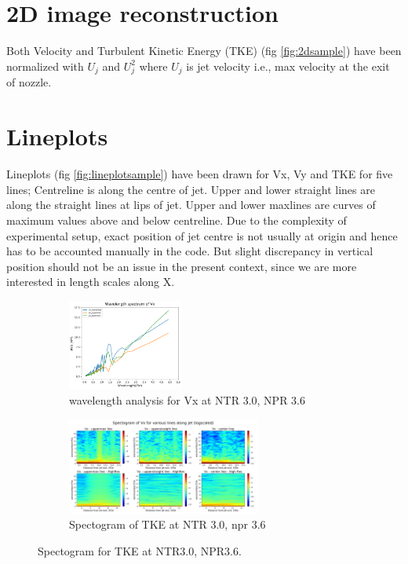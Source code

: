 \section{2D image reconstruction}
Both Velocity and Turbulent Kinetic Energy (TKE) (fig \ref{fig:2dsample}) have been normalized with $U_j$ and $U_j^2$ where $U_j$ is jet velocity i.e., max velocity at the exit of nozzle. 

\section{Lineplots}
Lineplots (fig \ref{fig:lineplotsample}) have been drawn for Vx, Vy and TKE for five lines; Centreline is along the centre of jet. Upper and lower straight lines are along the straight lines at lips of jet. Upper and lower maxlines are curves of maximum values above and below centreline. Due to the complexity of experimental setup, exact position of jet centre is not usually at origin and hence has to be accounted manually in the code. But slight discrepancy in vertical position should not be an issue in the present context, since we are more interested in length scales along X.

\begin{figure}[H]
\begin{subfigure}{.5\textwidth}
	\centering
	\includegraphics[width=1.5in]{images/fftsample.png}
	\caption{wavelength analysis for Vx at NTR 3.0, NPR 3.6}
	\label{fig:fftsample}
\end{subfigure}%
\begin{subfigure}{.5\textwidth}
	\centering
	\includegraphics[width=2.5in]{images/spectogramsample.png}
	\caption{Spectogram of TKE at NTR 3.0, npr 3.6}
	\label{fig:spectogramsample}
\end{subfigure}
\caption{ Spectogram for TKE at NTR3.0, NPR3.6.}
\label{fig:fft&spectogram}
\end{figure}

